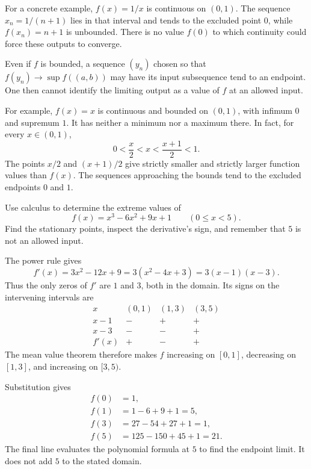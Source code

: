 For a concrete example, $f(x)=1/x$ is continuous on $(0,1)$.
The sequence $x_n=1/(n+1)$ lies in that interval and tends to the
excluded point $0$, while $f(x_n)=n+1$ is unbounded.
There is no value $f(0)$ to which continuity could force these
outputs to converge.

Even if $f$ is bounded, a sequence $(y_n)$ chosen so that
$f(y_n)\to\sup f((a,b))$ may have its input subsequence tend to
an endpoint. One then cannot identify the limiting output as a
value of $f$ at an allowed input.

For example, $f(x)=x$ is continuous and bounded on $(0,1)$, with
infimum $0$ and supremum $1$. It has neither a minimum nor a
maximum there. In fact, for every $x\in(0,1)$,
\[
 0<\frac{x}{2}<x<\frac{x+1}{2}<1.
\]
The points $x/2$ and $(x+1)/2$ give strictly smaller and strictly
larger function values than $f(x)$. The sequences approaching
the bounds tend to the excluded endpoints $0$ and $1$.

\goal Use calculus to determine the extreme values of
\[
 f(x)=x^3-6x^2+9x+1\qquad(0\le x<5).
\]
\idea Find the stationary points, inspect the derivative's sign,
and remember that $5$ is not an allowed input.

The power rule gives
\[
 f'(x)=3x^2-12x+9=3(x^2-4x+3)=3(x-1)(x-3).
\]
Thus the only zeros of $f'$ are $1$ and $3$, both in the
domain. Its signs on the intervening intervals are
\[
 \begin{array}{c|ccc}
 x&(0,1)&(1,3)&(3,5)\\ \hline
 x-1&-&+&+\\
 x-3&-&-&+\\
 f'(x)&+&-&+
 \end{array}
\]
The mean value theorem therefore makes $f$ increasing on $[0,1]$,
decreasing on $[1,3]$, and increasing on $[3,5)$.

Substitution gives
\[
 \begin{aligned}
 f(0)&=1,\\
 f(1)&=1-6+9+1=5,\\
 f(3)&=27-54+27+1=1,\\
 f(5)&=125-150+45+1=21.
 \end{aligned}
\]
The final line evaluates the polynomial formula at $5$ to find
the endpoint limit. It does not add $5$ to the stated domain.

